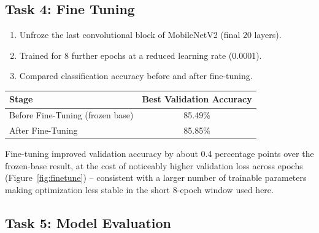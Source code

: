 \documentclass[11pt]{article}
\begin{document}

\subsection*{Task 4: Fine Tuning}

\begin{enumerate}

\item Unfroze the last convolutional block of MobileNetV2 (final 20 layers).

\item Trained for 8 further epochs at a reduced learning rate (0.0001).

\item Compared classification accuracy before and after fine-tuning.

\end{enumerate}

\begin{center}

\begin{tabular}{|l|c|}

\hline

Stage & Best Validation Accuracy\\

\hline

Before Fine-Tuning (frozen base) & 85.49\%\\

\hline

After Fine-Tuning & 85.85\%\\

\hline

\end{tabular}

\end{center}

Fine-tuning improved validation accuracy by about 0.4 percentage points
over the frozen-base result, at the cost of noticeably higher validation
loss across epochs (Figure~\ref{fig:finetune}) -- consistent with a larger
number of trainable parameters making optimization less stable in the
short 8-epoch window used here.


\subsection*{Task 5: Model Evaluation}
\end{document}
